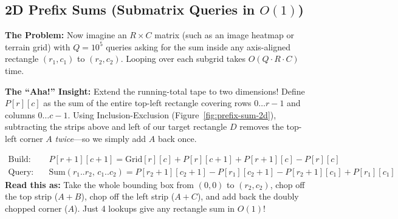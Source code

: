 \documentclass[11pt,a4paper]{article}
\theoremstyle{definition}
\newcommand{\painbeat}{\textbf{\color{accentamber}The Problem:} }
\newcommand{\ahabeat}{\textbf{\color{accentteal}The ``Aha!'' Insight:} }
\begin{document}
\subsection{2D Prefix Sums (Submatrix Queries in $O(1)$)}

\painbeat Now imagine an $R \times C$ matrix (such as an image heatmap or terrain grid) with $Q = 10^5$ queries asking for the sum inside any axis-aligned rectangle $(r_1, c_1)$ to $(r_2, c_2)$. Looping over each subgrid takes $O(Q \cdot R \cdot C)$ time.

\ahabeat Extend the running-total tape to two dimensions! Define $P[r][c]$ as the sum of the entire top-left rectangle covering rows $0 \dots r - 1$ and columns $0 \dots c - 1$. Using Inclusion-Exclusion (Figure~\ref{fig:prefix-sum-2d}), subtracting the strips above and left of our target rectangle $D$ removes the top-left corner $A$ \emph{twice}---so we simply add $A$ back once.

\begin{formulabox}
\[
\begin{aligned}
    \text{Build:}\quad & P[r+1][c+1] = \text{Grid}[r][c] + P[r][c+1] + P[r+1][c] - P[r][c] \\
    \text{Query:}\quad & \text{Sum}(r_1..r_2,\, c_1..c_2) = P[r_2+1][c_2+1] - P[r_1][c_2+1] - P[r_2+1][c_1] + P[r_1][c_1]
\end{aligned}
\]
\textbf{Read this as:} Take the whole bounding box from $(0, 0)$ to $(r_2, c_2)$, chop off the top strip ($A + B$), chop off the left strip ($A + C$), and add back the doubly chopped corner ($A$). Just 4 lookups give any rectangle sum in $O(1)$!
\end{formulabox}
\end{document}
